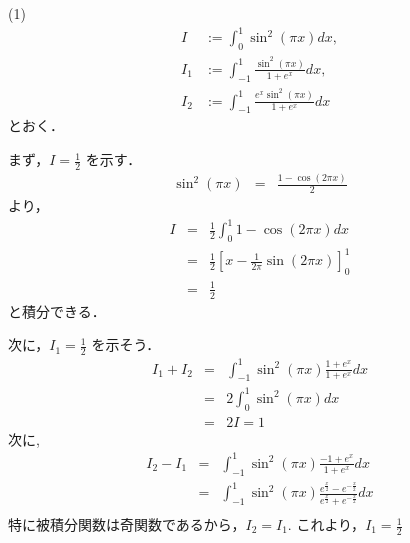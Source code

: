\documentclass[main]{subfiles}
\begin{document}
\begin{pf}
(1) 
\begin{eqnarray*}
I &:= \int^1_0\sin^2(\pi x) dx, \\
I_1 &:= \int^1_{-1}\frac{\sin^2(\pi x)}{1+e^x}dx, \\
I_2 &:= \int^1_{-1}\frac{e^x\sin^2(\pi x)}{1+e^x}dx
\end{eqnarray*}
とおく．

まず，$I = \frac{1}{2}$ を示す．
\begin{eqnarray*}
\sin^2(\pi x) &=& \frac{1-\cos(2\pi x)}{2}
\end{eqnarray*}
より，
\begin{eqnarray*}
I &=& \frac{1}{2}\int^1_0 1-\cos(2\pi x)dx \\
	&=& \frac{1}{2}[x-\frac{1}{2\pi}\sin(2\pi x)]^1_0 \\
	&=& \frac{1}{2}
\end{eqnarray*}
と積分できる．

次に，$I_1 = \frac{1}{2}$ を示そう．
\begin{eqnarray*}
I_1 + I_2 &=& \int^1_{-1}\sin^2(\pi x) \frac{1+e^x}{1+e^x}dx \\
			&=& 2\int^1_0\sin^2(\pi x)dx \\
			&=& 2I = 1
\end{eqnarray*}
次に, 
\begin{eqnarray*}
I_2 -I_1 &=& \int^1_{-1}\sin^2(\pi x) \frac{-1+e^x}{1+e^x}dx \\
&=& \int^1_{-1}\sin^2(\pi x) 
					\frac{e^\frac{x}{2}-e^{-\frac{x}{2}}}{e^\frac{x}{2}+e^{-\frac{x}{2}}}dx \\
\end{eqnarray*}
特に被積分関数は奇関数であるから，$I_2 = I_1$. これより，$I_1 =\frac{1}{2}$
\end{pf}
\begin{prob}

\end{prob}
\begin{pf}

\end{pf}
\end{document}
